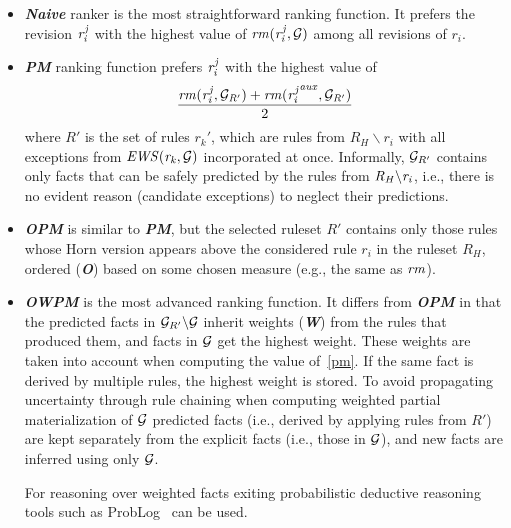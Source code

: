 \begin{itemize}
    \item {\textbf{\em Naive}} ranker is the most straightforward ranking function. It prefers the revision $\mathit{r^j_i}$ with the highest value of $\mathit{rm(r^j_{i},\mathcal{G})}$ among all revisions of $r_i$.
    \item {\textbf{\em PM}} ranking function prefers $\mathit{r^j_i}$ with the highest value of
\begin{equation}
\label{pm}
\dfrac{\mathit{rm(r^j_i,\mathcal{G}_{R'})+rm({r^j_i}^{aux},\mathcal{G}_{R'})}}{2}
\end{equation}
 where $R'$ is the set of rules $r_k'$, which are rules from $R_H\backslash r_i$ with all exceptions from $\mathit{EWS(r_k,\mathcal{G})}$ incorporated at once. Informally, $\mathcal{G}_{R'}$ contains only facts that can be safely predicted by the rules from $\mathit{R_H\backslash r_i}$, i.e., there is no evident reason (candidate exceptions) to neglect their predictions.
    \item {\textbf{\em OPM}} is similar to \textbf{{\em PM}}, but the selected ruleset $R'$ contains only those rules whose Horn version appears above the considered rule $r_i$ in the ruleset $R_H$, ordered (\textbf{\em O}) based on some chosen measure (e.g., the same as $\mathit{rm}$). %
\smallskip

    \item {\textbf{\em OWPM}} is the most advanced ranking function. It differs from \textbf{\em OPM} in that the predicted facts in $\mathcal{G}_{R'}\backslash \mathcal{G}$ inherit weights (\textbf{\em W}) from the rules that produced them, and facts in $\mathcal{G}$ get the highest weight. These weights are taken into account when computing the value of~\ref{pm}. If the same fact is derived by multiple rules,  the highest weight is stored. To avoid propagating uncertainty through rule chaining when computing weighted partial materialization of $\mathcal{G}$ predicted facts (i.e., derived by applying rules from $R'$) are kept separately from the explicit facts (i.e., those in $\mathcal{G}$), and %
new facts are inferred using only $\mathcal{G}$.

For reasoning over weighted facts exiting 
probabilistic deductive reasoning tools such as ProbLog~\cite{problog2007,problog2015} can be used.
\end{itemize}


